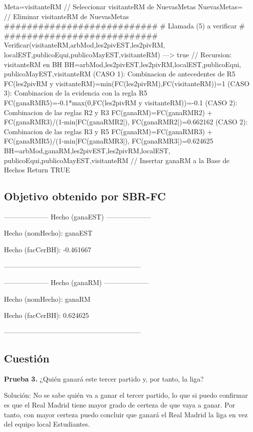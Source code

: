 \begin{listing}[language=Pascal]
	Meta=visitanteRM // Seleccionar visitanteRM de NuevasMetas
	NuevasMetas={} // Eliminar visitanteRM de NuevasMetas
  ###########################
  # Llamada (5) a verificar #
  ###########################
	Verificar(visitanteRM,{arbMod,les2pivEST,les2pivRM, localEST,publicoEqui,publicoMayEST,visitanteRM}) ---> true // Recursion: visitanteRM en BH
	BH={arbMod,les2pivEST,les2pivRM,localEST,publicoEqui, publicoMayEST,visitanteRM}
	(CASO 1): Combinacion de antecedentes de R5
	 FC(les2pivRM y visitanteRM)=min(FC(les2pivRM),FC(visitanteRM))=1
	(CASO 3): Combinacion de la evidencia con la regla R5
	 FC(ganaRM{R5})=-0.1*max(0,FC(les2pivRM y visitanteRM))=-0.1
	(CASO 2): Combinacion de las reglas R2 y R3
	 FC(ganaRM)=FC(ganaRM{R2}) + FC(ganaRM{R3})/(1-min{|FC(ganaRM{R2}|), FC(ganaRM{R2}|})=0.662162
	(CASO 2): Combinacion de las reglas R3 y R5
	 FC(ganaRM)=FC(ganaRM{R3}) + FC(ganaRM{R5})/(1-min{|FC(ganaRM{R3}|), FC(ganaRM{R3}|})=0.624625
	BH={arbMod,ganaRM,les2pivEST,les2pivRM,localEST, publicoEqui,publicoMayEST,visitanteRM} // Insertar ganaRM a la Base de Hechos
Return TRUE
\end{listing}

\subsection{Objetivo obtenido por SBR-FC}
\begin{center}
\par -------------------- Hecho (ganaEST) --------------------
\par Hecho (nomHecho): ganaEST
\par Hecho (facCerBH): -0.461667
\par ------------------------------------------------------------
\par -------------------- Hecho (ganaRM) --------------------
\par Hecho (nomHecho): ganaRM
\par Hecho (facCerBH): 0.624625
\par ------------------------------------------------------------
\end{center}
\subsection{Cuestión}
\begin{ejer}
	\textbf{Prueba 3.} ¿Quién ganará este tercer partido y, por tanto, la liga?
\end{ejer}
Solución: No se sabe quién va a ganar el tercer partido, lo que si puedo confirmar es que
el Real Madrid tiene mayor grado de certeza de que vaya a ganar. Por tanto, con mayor certeza puedo concluir que
ganará el Real Madrid la liga en vez del equipo local Estudiantes.